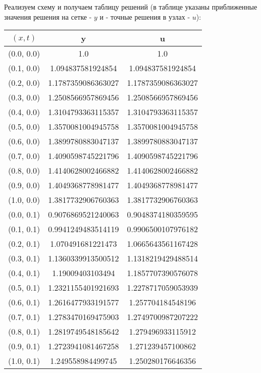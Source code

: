 Реализуем схему и получаем таблицу решений (в таблице указаны приближенные значения решения на сетке - $y$ и - точные решения в узлах - $u$):
\tiny
\begin{table}[H]
\begin{tabular}{|c|c|c|}
\hline
$(x,t)$ &  y & u \\
\hline
(0.0, 0.0) & 1.0 & 1.0 \\
\hline
(0.1, 0.0) & 1.094837581924854 & 1.094837581924854 \\
\hline
(0.2, 0.0) & 1.1787359086363027 & 1.1787359086363027 \\
\hline
(0.3, 0.0) & 1.2508566957869456 & 1.2508566957869456 \\
\hline
(0.4, 0.0) & 1.3104793363115357 & 1.3104793363115357 \\
\hline
(0.5, 0.0) & 1.3570081004945758 & 1.3570081004945758 \\
\hline
(0.6, 0.0) & 1.3899780883047137 & 1.3899780883047137 \\
\hline
(0.7, 0.0) & 1.4090598745221796 & 1.4090598745221796 \\
\hline
(0.8, 0.0) & 1.4140628002466882 & 1.4140628002466882 \\
\hline
(0.9, 0.0) & 1.4049368778981477 & 1.4049368778981477 \\
\hline
(1.0, 0.0) & 1.3817732906760363 & 1.3817732906760363 \\
\hline
\hline
(0.0, 0.1) & 0.9076869521240063 & 0.9048374180359595 \\
\hline
(0.1, 0.1) & 0.9941249483514119 & 0.9906500107976182 \\
\hline
(0.2, 0.1) & 1.070491681221473 & 1.0665643561167428 \\
\hline
(0.3, 0.1) & 1.1360339913500512 & 1.1318219429488514 \\
\hline
(0.4, 0.1) & 1.19009403103494 & 1.1857707390576078 \\
\hline
(0.5, 0.1) & 1.2321155401921693 & 1.2278717059053939 \\
\hline
(0.6, 0.1) & 1.2616477933191577 & 1.257704184548196 \\
\hline
(0.7, 0.1) & 1.2783470169475903 & 1.2749700987207222 \\
\hline
(0.8, 0.1) & 1.2819749548185642 & 1.279496933115912 \\
\hline
(0.9, 0.1) & 1.2723941081467258 & 1.271239457100862 \\
\hline
(1.0, 0.1) & 1.249558984499745 & 1.250280176646356 \\
\hline
\hline

\end{tabular}
\end{table}
